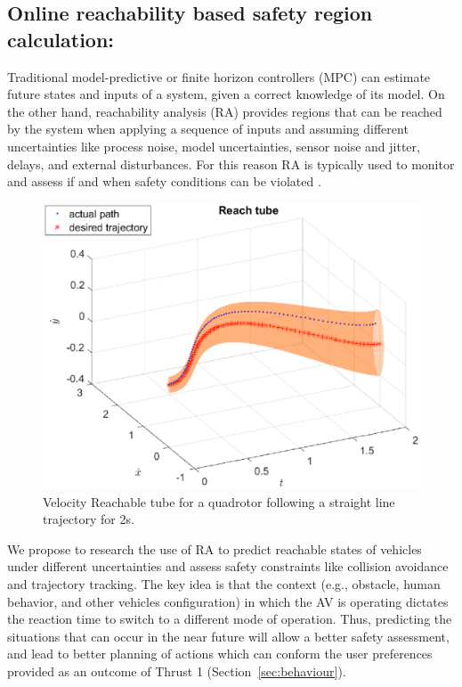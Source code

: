 \subsection{Online reachability based safety region calculation:}
\label{subsec:online_reach}

Traditional model-predictive or finite horizon controllers (MPC) \cite{bernardini2012stabilizing, elnaggar17AHS, bezzo2016stochastic} can estimate future states and inputs of a system, given a correct knowledge of its model. On the other hand, reachability analysis (RA) \cite{TomlinRAM11, TomlinICRA11, esen18ICRA, esen17AHS, esen17ISAR} provides regions that can be reached by the system when applying a sequence of inputs and assuming different uncertainties like process noise, model uncertainties, sensor noise and jitter, delays, and external disturbances. For this reason RA is typically used to monitor and assess if and when safety conditions can be violated \cite{gillula2011applications, gillula2010design, althoff2010reachability}.
\begin{figure}
\vspace{-5pt}
\centering
\includegraphics[width = \linewidth ]{fig/reach_set_vel.eps} 
\caption{Velocity Reachable tube for a quadrotor following a straight line trajectory for 2s.}
\vspace{-5pt}
\label{fig:reach_set}
\end{figure}
We propose to research the use of RA to predict reachable states of vehicles under different uncertainties and assess safety constraints like collision avoidance and trajectory tracking. The key idea is that the context (e.g., obstacle, human behavior, and other vehicles configuration) in which the AV is operating dictates the reaction time to switch to a different mode of operation. 
Thus, predicting the situations that can occur in the near future will allow a better safety assessment, and lead to better planning of actions which can conform the user preferences provided as an outcome of Thrust 1 (Section~\ref{sec:behaviour}).

